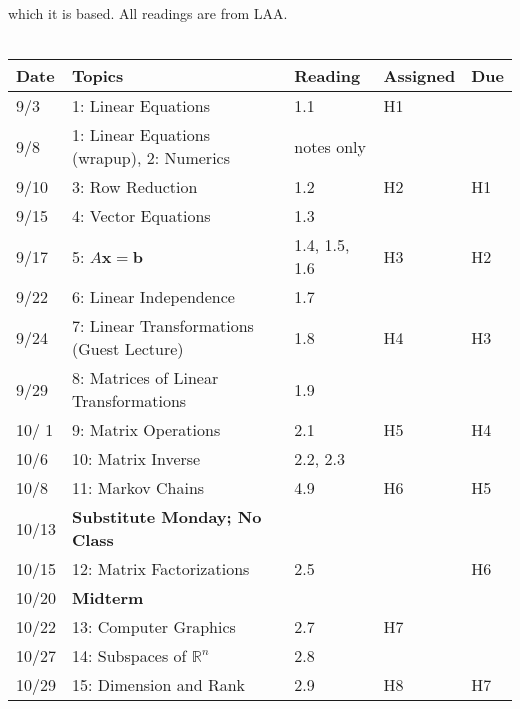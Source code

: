 \documentclass[11pt]{article}
\begin{document}
which it is based.   All readings are from LAA.
\\~\\
\small
\begin{centering}
\begin{tabular}{||l|p{3in}|l|l|l||}
\hline\hline
Date & Topics  & Reading & Assigned & Due  \\
\hline\hline
9/3 & 1: Linear Equations & 1.1 & H1  & \\
\hline

9/8 & 1: Linear Equations (wrapup), 2: Numerics &  notes only &  & \\
9/10 &  3: Row Reduction & 1.2 & H2 & H1 \\
\hline

9/15 & 4: Vector Equations  & 1.3 &  & \\
9/17 & 5: $A\mathbf{x} =\mathbf{b}$   & 1.4, 1.5, 1.6 & H3 & H2 \\ %
\hline

9/22 & 6: Linear Independence  & 1.7 & & \\
9/24 & 7: Linear Transformations  (Guest Lecture) &  1.8 & H4 & H3\\ 
\hline

9/29 & 8: Matrices of Linear Transformations & 1.9 & & \\  
10/ 1 &9: Matrix Operations   & 2.1 & H5 & H4 \\ 
\hline

10/6 & 10: Matrix Inverse  & 2.2, 2.3 & &  \\   
10/8 &11: Markov Chains  &4.9 & H6 & H5 \\ %
\hline

% 
10/13 & \textbf{Substitute Monday; No Class} &&&\\
10/15 & 12: Matrix Factorizations  & 2.5 & & H6 \\ 
\hline

10/20 &  \textbf{Midterm} & &  & \\ 
10/22 & 13: Computer Graphics  & 2.7 & H7& \\ 
\hline

10/27 & 14: Subspaces of $\mathbb{R}^n$  & 2.8 &  &\\ 
10/29 & 15: Dimension and Rank  & 2.9 & H8 & H7\\ 
\hline


\end{tabular}
\end{centering}
\end{document}
